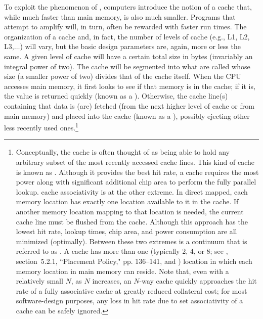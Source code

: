 To exploit the phenomenon of , computers
introduce the notion of a cache that, while much faster than main
memory, is also much smaller. Programs that attempt to amplify
 will, in turn, often be rewarded with
faster run times. The organization of a cache and, in fact, the number of
levels of cache (e.g., L1, L2, L3,$\ldots$) will vary, but the basic
design parameters are, again, more or less the same. A given level of
cache will have a certain total size in bytes (invariably an integral
power of two). The cache will be segmented into what are called
 whose size (a smaller power of two) divides that of
the cache itself. When the CPU accesses main memory, it first looks to
see if that memory is in the cache; if it is, the value is returned
quickly (known as a ). Otherwise, the cache line(s)
containing that data is (are) fetched (from the next higher level of cache
or from main memory) and placed into the cache (known as a ), possibly ejecting other less recently used
ones.{\cprotect\footnote{Conceptually, the cache is often thought of as
being able to hold any arbitrary subset of the most recently accessed
cache lines. This kind of cache is known as . Although it provides the best hit rate, a  cache requires the most power along with significant
additional chip area to perform the fully parallel lookup.  cache associativity is at the
other extreme. In direct mapped, each memory location has exactly one location
available to it in the cache. If another memory location mapping to
that location is needed, the current cache line must be flushed from
the cache. Although this approach has the lowest hit rate, lookup
times, chip area, and power consumption are all minimized (optimally).
Between these two extremes is a continuum that is referred to as
. A  cache has more than
  one (typically 2, 4, or 8; see \cite{solihin15}, section~5.2.1, ``Placement Policy," pp. 136--141, and \cite{hruska20})
  location in which each memory location in main memory can reside.
  Note that, even with a relatively small $N$, as $N$ increases, an $N$-way
   cache quickly approaches the hit rate of a fully
  associative cache at greatly reduced collateral cost; for most
  software-design purposes, any loss in hit rate due to set
  associativity of a cache can be safely ignored.}}

